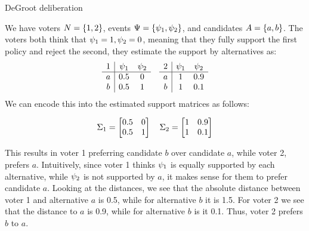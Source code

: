 \begin{example}{DeGroot deliberation} {}

	We have voters \(N = \{1,2\}\), events \(\Psi =
	\{\psi_{1}, \psi_{2}\}\), and candidates \(A =
	\{a,b\}\). The voters both think that \(\psi_{1} = 1, \psi_{2} =
	0\), meaning that they fully support the first policy and reject the
	second, they estimate the support by alternatives as: \[
		\begin{array}{c|cc} 1 & \psi_1 & \psi_2 \\ \hline a & 0.5
		& 0         \\ b & 0.5       & 1         \\ \end{array}
			\hspace{1em} \begin{array}{c|cc} 2 & \psi_1 &
				\psi_2 \\ \hline a & 1         & 0.9
			\\ b & 1         & 0.1       \\ \end{array} \] We can
			encode this into the estimated support matrices as
			follows:

				\[ \Sigma_1 =\begin{bmatrix} 0.5 & 0 \\
					0.5 & 1 \\ \end{bmatrix}\quad
					\Sigma_2 =\begin{bmatrix} 1 & 0.9
					\\ 1 & 0.1 \\ \end{bmatrix} \]

					This results in voter 1 preferring
					candidate $b$ over candidate $a$, while
					voter 2, prefers $a$. Intuitively,
					since voter 1 thinks $\psi_{1}$ is
					equally supported by each alternative,
					while $\psi_{2}$ is not supported by
					$a$, it makes sense for them to prefer
					candidate $a$. Looking at the
					distances, we see that the absolute
					distance between voter 1 and
					alternative $a$ is 0.5, while for
					alternative $b$ it is 1.5. For voter 2
					we see that the distance to $a$ is 0.9,
					while for alternative $b$ is it 0.1.
					Thus, voter 2 prefers $b$ to $a$.



\end{example}
